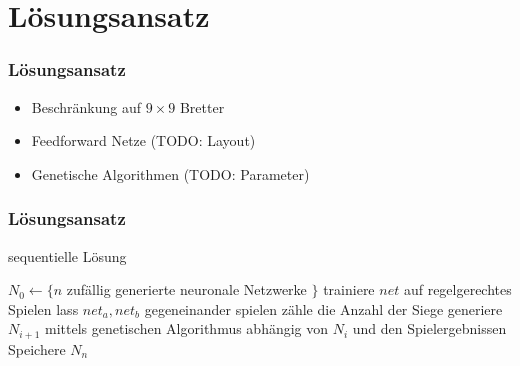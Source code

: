 \section{Lösungsansatz}

\begin{frame}
    \frametitle{Lösungsansatz}

    \begin{itemize}
        \item Beschränkung auf $9 \times 9$ Bretter
        \item Feedforward Netze (TODO: Layout)
        \item Genetische Algorithmen (TODO: Parameter)
    \end{itemize}
\end{frame}

\begin{frame}
    \frametitle{Lösungsansatz}

    \begin{algorithm}[H]
        \caption{sequentielle Lösung}
        \begin{algorithmic}[1]
            \State $N_0 \gets \{ n$ zufällig generierte neuronale Netzwerke $\}$
                \State trainiere $net$ auf regelgerechtes Spielen
            \EndFor
                    \State lass $net_a, net_b$ gegeneinander spielen
                    \State zähle die Anzahl der Siege
                \EndFor
                \State generiere $N_{i+1}$ mittels genetischen Algorithmus
                abhängig von $N_i$ und den Spielergebnissen
            \EndFor
            \State Speichere $N_n$
        \end{algorithmic}
    \end{algorithm}
\end{frame}

